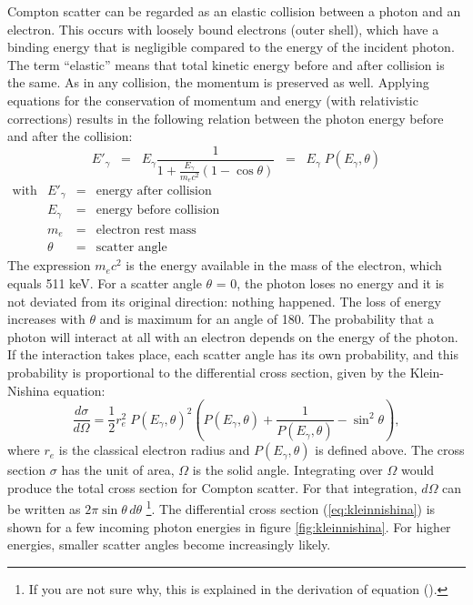 Compton scatter can be regarded as an elastic collision between a
photon and an electron. This occurs with loosely bound electrons
(outer shell), which have a binding energy that is negligible compared
to the energy of the incident photon. The term ``elastic'' means that
total kinetic energy before and after collision is the same. As in any
collision, the momentum is preserved as well. Applying equations for
the conservation of momentum and energy (with relativistic
corrections) results in the following relation between the photon
energy before and after the collision:
\begin{equation}
  E'_\gamma \;\;=\;\; E_\gamma \frac{1}{1 
     + \displaystyle\frac{E_\gamma}{m_e c^2} (1 - \cos\theta)} \label{eq:jn_compton_energy}
   \;\; = \;\; E_\gamma \; P(E_\gamma, \theta)
\end{equation}
%
$\begin{array}{llrl}
\mbox{with}
            & E'_\gamma & = & \mbox{energy after collision}\\
            & E_\gamma  & = & \mbox{energy before collision}\\
            & m_e       & = & \mbox{electron rest mass}\\
            & \theta    & = & \mbox{scatter angle}
\end{array}$\\
%
The expression $m_e c^2$ is the energy available in the mass of the
electron, which equals 511 keV. For a scatter angle $\theta$ = 0, the
photon loses no energy and it is not deviated from its original
direction: nothing happened.  The loss of energy increases with
$\theta$ and is maximum for an angle of 180\textdegree. The probability
that a photon will interact at all with an electron depends on the
energy of the photon. If the interaction takes place, each scatter
angle has its own probability, and this probability is proportional to
the differential cross section, given by the Klein-Nishina equation:
\begin{equation}
 \frac{d\sigma}{d\Omega} = \frac{1}{2} r_e^2 \; P(E_\gamma, \theta)^2
    \left( P(E_\gamma, \theta) + \frac{1}{P(E_\gamma, \theta)} - \sin^2\theta \right),
    \label{eq:kleinnishina}
\end{equation}
where $r_e$ is the classical electron radius and $P(E_\gamma, \theta)$
is defined above. The cross section $\sigma$ has the unit of area,
$\Omega$ is the solid angle. Integrating over $\Omega$
would produce the total cross section for Compton scatter. For that
integration, $d\Omega$ can be written as $2 \pi \sin\theta \,d\theta$
\footnote{If you are not sure why, this is explained in the derivation
  of equation ().}.
The differential cross section (\ref{eq:kleinnishina}) is shown for a
few incoming photon energies in figure \ref{fig:kleinnishina}. For
higher energies, smaller scatter angles become increasingly likely.

